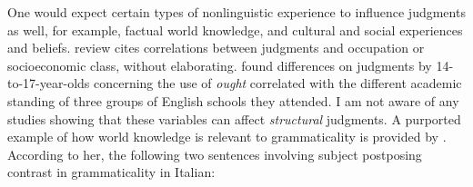 One would expect certain types of nonlinguistic experience to influence judgments as well, for example, factual world knowledge, and cultural and social
experiences and beliefs.  review
cites correlations between judgments and occupation or socioeconomic class, without elaborating. \citet{SvartvikEtAl1977} found differences on judgments by 14-to-17-year-olds concerning the use of \textit{ought} correlated with the different academic standing of three groups of English schools they attended. I am not aware of any studies showing that these variables can affect \textit{structural} judgments. A purported example of how world knowledge is relevant to grammaticality is provided by \citet{Belletti1988}. According to her, the following two sentences involving subject postposing contrast in grammaticality in Italian:

\ea%
    \label{ex:4:9}
    \z
\z


